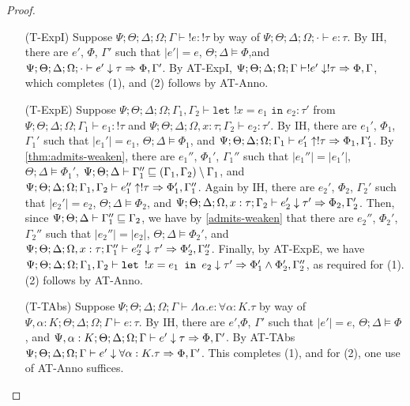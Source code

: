 \begin{proof}
\begin{itemize}
  \item[(T-ExpI)] Suppose
  $\Psi ; \Theta ; \Delta ; \Omega ; \Gamma \vdash !e : !\tau$ by way of
  $\Psi ; \Theta ; \Delta ; \Omega ; \cdot \vdash e : \tau$.
  By IH, there are $e'$, $\Phi$, $\Gamma'$ such that
  $|e'| = e$,
  $\Theta ; \Delta \vDash \Phi$,and
  $\Psi ; \Theta ; \Delta ; \Omega; \cdot \vdash e' \downarrow \tau \Rightarrow \Phi,\Gamma'$.
  By AT-ExpI,
  $\Psi ; \Theta ; \Delta ; \Omega; \Gamma \vdash !e' \downarrow !\tau \Rightarrow \Phi,\Gamma$,
  which completes (1), and (2) follows by AT-Anno.        
  
  \item[(T-ExpE)] Suppose
  $\Psi ; \Theta ; \Delta ; \Omega ; \Gamma_1,\Gamma_2 \vdash \texttt{let } !x = e_1 \texttt{ in } e_2 : \tau'$ from
  $\Psi ; \Theta ; \Delta ; \Omega ; \Gamma_1 \vdash e_1  : !\tau$ and
  $\Psi ; \Theta ; \Delta ; \Omega, x : \tau ; \Gamma_2 \vdash e_2 : \tau'$.
  By IH, there are $e_1'$, $\Phi_1$, $\Gamma_1'$ such that
  $|e_1'| = e_1$,
  $\Theta ; \Delta \vDash \Phi_1$, and
  $\Psi ; \Theta ; \Delta ; \Omega ; \Gamma_1 \vdash e_1' \uparrow !\tau \Rightarrow \Phi_1,\Gamma_1'$.
  By \autoref{thm:admits-weaken}, there are $e_1''$, $\Phi_1'$, $\Gamma_1''$ such that
  $|e_1''| = |e_1'|$,
  $\Theta ; \Delta \vDash \Phi_1'$,
  $\Psi ; \Theta ; \Delta \vdash \Gamma_1'' \sqsubseteq (\Gamma_1,\Gamma_2) \setminus \Gamma_1$, and
  $\Psi ; \Theta ; \Delta ; \Omega; \Gamma_1,\Gamma_2 \vdash e_1'' \uparrow !\tau \Rightarrow \Phi_1',\Gamma_1''$.
  Again by IH, there are $e_2'$, $\Phi_2$, $\Gamma_2'$ such that
  $|e_2'| = e_2$,
  $\Theta ; \Delta \vDash \Phi_2$, and
  $\Psi ; \Theta ; \Delta ; \Omega, x: \tau ; \Gamma_2 \vdash e_2' \downarrow \tau' \Rightarrow \Phi_2,\Gamma_2'$.
  Then, since
  $\Psi ; \Theta ; \Delta \vdash \Gamma_1'' \sqsubseteq \Gamma_2$,
  we have by \autoref{admits-weaken} that there are $e_2''$, $\Phi_2'$, $\Gamma_2''$ such that
  $|e_2''| = |e_2|$,
  $\Theta ; \Delta \vDash \Phi_2'$, and
  $\Psi ; \Theta ; \Delta ; \Omega, x : \tau ; \Gamma_1'' \vdash e_2'' \downarrow \tau' \Rightarrow \Phi_2', \Gamma_2''$.
  Finally, by AT-ExpE, we have
  $\Psi ; \Theta ; \Delta ; \Omega ; \Gamma_1,\Gamma_2 \vdash \texttt{let } !x = e_1 \texttt{ in } e_2 \downarrow \tau' \Rightarrow \Phi_1' \wedge \Phi_2', \Gamma_2''$,
  as required for (1). (2) follows by AT-Anno.
  
  \item[(T-TAbs)] Suppose
  $\Psi ; \Theta ; \Delta ; \Omega ; \Gamma \vdash \Lambda \alpha. e : \forall \alpha : K.\tau$ by way of
  $\Psi, \alpha : K ; \Theta ; \Delta ; \Omega ; \Gamma \vdash e : \tau$.
  By IH, there are $e'$,$\Phi$, $\Gamma'$ such that
  $|e'| = e$,
  $\Theta ; \Delta \vDash \Phi$, and
  $\Psi, \alpha : K ; \Theta ; \Delta ; \Omega ; \Gamma \vdash e' \downarrow \tau \Rightarrow \Phi,\Gamma'$.
  By AT-TAbs
  $\Psi ; \Theta ; \Delta ; \Omega ; \Gamma \vdash e' \downarrow \forall \alpha : K. \tau \Rightarrow \Phi,\Gamma'$.
  This completes (1), and for (2), one use of AT-Anno suffices.
    

\end{itemize}
\end{proof}

